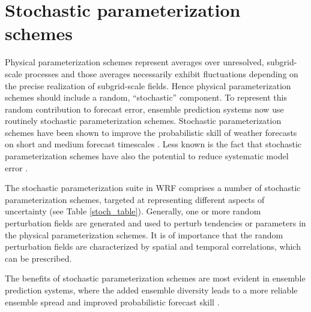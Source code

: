 \chapter{Stochastic parameterization schemes}
\label{stoch}

Physical parameterization schemes represent averages over unresolved,
subgrid-scale processes and those averages necessarily exhibit
fluctuations depending on the precise realization of subgrid-scale
fields.  Hence physical parameterization schemes should include a random,
``stochastic'' component.  To represent this random contribution to
forecast error, ensemble prediction systems now use routinely stochastic
parameterization schemes.
Stochastic parameterization schemes have been shown to improve the
probabilistic skill of weather forecasts on short and medium forecast
timescales 
\citep[e.g.][]{Be09,Be11,leutbecher2017stochastic}.
Less known is the fact that stochastic parameterization schemes have also the
potential to reduce systematic model error 
\citep[e.g.][]{berner2017stochastic}.

The stochastic parameterization suite in WRF comprises a number of
stochastic parameterization schemes, targeted at representing different aspects 
of uncertainty (see Table \ref{stoch_table}). Generally, one or more random
perturbation fields are generated and used to perturb tendencies or
parameters in the physical parameterization schemes.  It is of importance
that the random perturbation fields are characterized by spatial and temporal
correlations, which can be prescribed.

The benefits of stochastic parameterization schemes are most evident in ensemble 
prediction systems, where the added ensemble diversity leads to a more reliable 
ensemble spread and improved probabilistic forecast skill \citep[e.g.][]{Be15}.

